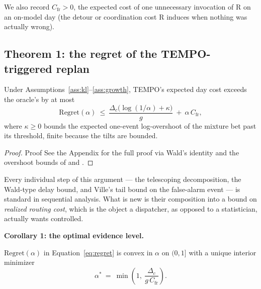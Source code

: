 \documentclass[trsc,dblanonrev]{informs4}
\newcommand{\Rmax}{\mathrm{R}}
\begin{document}
We also record $C_{\mathrm{fr}} > 0$, the expected cost of one
unnecessary invocation of $\Rmax$ on an on-model day (the detour or
coordination cost $\Rmax$ induces when nothing was actually wrong).

\subsection{Theorem 1: the regret of the TEMPO-triggered replan}

\begin{theorem}\label{thm:regret}
Under Assumptions~\ref{ass:kl}--\ref{ass:growth}, TEMPO's expected day
cost exceeds the oracle's by at most
\begin{equation}\label{eq:regret}
\mathrm{Regret}(\alpha) \ \le\ \frac{\Delta_c\bigl(\log(1/\alpha) +
\kappa\bigr)}{g} \ +\ \alpha\, C_{\mathrm{fr}},
\end{equation}
where $\kappa \ge 0$ bounds the expected one-event log-overshoot of the
mixture bet past its threshold, finite because the tilts are bounded.
\end{theorem}

\begin{proof}{Proof}
See the Appendix for the full proof via
Wald's identity and the overshoot bounds of
\citet{lorden1970excess} and \citet{woodroofe1982nonlinear}.
\end{proof}



Every individual step of this argument --- the telescoping decomposition,
the Wald-type delay bound, and Ville's tail bound on the false-alarm
event --- is standard in sequential analysis. What is new is their
composition into a bound on \emph{realized routing cost}, which is the
object a dispatcher, as opposed to a statistician, actually wants
controlled.

\textbf{Corollary 1: the optimal evidence level.}

\begin{corollary}\label{cor:alphastar}
$\mathrm{Regret}(\alpha)$ in Equation~\eqref{eq:regret} is convex in
$\alpha$ on $(0,1]$ with a unique interior minimizer
\begin{equation}\label{eq:alphastar}
\alpha^\ast \ =\ \min\!\left(1,\ \frac{\Delta_c}{g\, C_{\mathrm{fr}}}\right).
\end{equation}
\end{corollary}
\end{document}
